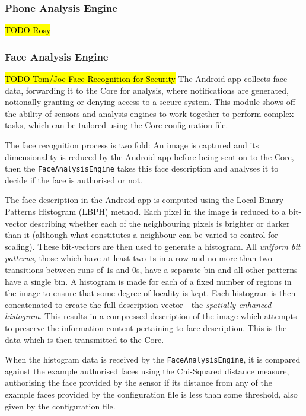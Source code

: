 \documentclass[10pt,a4paper]{article}
\begin{document}
\subsubsection{Phone Analysis Engine}
\hl{TODO Rosy}

\subsubsection{Face Analysis Engine}

\hl{TODO Tom/Joe Face Recognition for Security}
The Android app collects face data, forwarding it to the Core for analysis, where notifications are generated, notionally granting or denying access to a secure system. This module shows off the ability of sensors and analysis engines to work together to perform complex tasks, which can be tailored using the Core configuration file.

The face recognition process is two fold: An image is captured and its dimensionality is reduced by the Android app before being sent on to the Core, then the \texttt{FaceAnalysisEngine} takes this face description and analyses it to decide if the face is authorised or not.

The face description in the Android app is computed using the Local Binary Patterns Histogram (LBPH) \cite{ahonen2006face} method. Each pixel in the image is reduced to a bit-vector describing whether each of the neighbouring pixels is brighter or darker than it (although what constitutes a neighbour can be varied to control for scaling). These bit-vectors are then used to generate a histogram. All \emph{uniform bit patterns}, those which have at least two $1$s in a row and no more than two transitions between runs of $1$s and $0$s, have a separate bin and all other patterns have a single bin. A histogram is made for each of a fixed number of regions in the image to ensure that some degree of locality is kept. Each histogram is then concatenated to create the full description vector---the \emph{spatially enhanced histogram}. This results in a compressed description of the image which attempts to preserve the information content pertaining to face description. This is the data which is then transmitted to the Core.

When the histogram data is received by the \texttt{FaceAnalysisEngine}, it is compared against the example authorised faces using the Chi-Squared distance measure, authorising the face provided by the sensor if its distance from any of the example faces provided by the configuration file is less than some threshold, also given by the configuration file.
\end{document}
